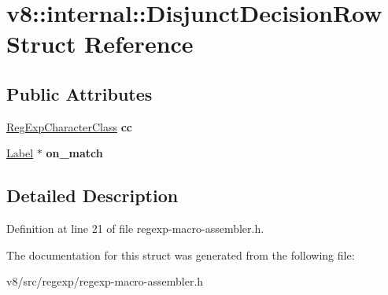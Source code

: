 \hypertarget{structv8_1_1internal_1_1DisjunctDecisionRow}{}\section{v8\+:\+:internal\+:\+:Disjunct\+Decision\+Row Struct Reference}
\label{structv8_1_1internal_1_1DisjunctDecisionRow}
\subsection*{Public Attributes}
\begin{DoxyCompactItemize}
\item 
\mbox{\label{structv8_1_1internal_1_1DisjunctDecisionRow_a00ccd419406cacc950f0bebaec37b155}} 
\mbox{\hyperlink{classv8_1_1internal_1_1RegExpCharacterClass}{Reg\+Exp\+Character\+Class}} {\bfseries cc}
\item 
\mbox{\label{structv8_1_1internal_1_1DisjunctDecisionRow_ace085ac637c04fa532662369dcede45e}} 
\mbox{\hyperlink{classv8_1_1internal_1_1Label}{Label}} $\ast$ {\bfseries on\+\_\+match}
\end{DoxyCompactItemize}


\subsection{Detailed Description}


Definition at line 21 of file regexp-\/macro-\/assembler.\+h.



The documentation for this struct was generated from the following file\+:\begin{DoxyCompactItemize}
\item 
v8/src/regexp/regexp-\/macro-\/assembler.\+h\end{DoxyCompactItemize}
